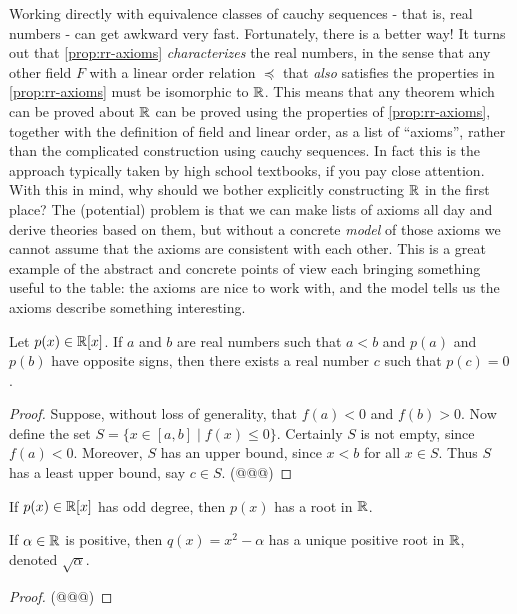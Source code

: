 Working directly with equivalence classes of cauchy sequences - that is, real numbers - can get awkward very fast. Fortunately, there is a better way! It turns out that \ref{prop:rr-axioms} \emph{characterizes} the real numbers, in the sense that any other field \(F\) with a linear order relation \(\preceq\) that \emph{also} satisfies the properties in \ref{prop:rr-axioms} must be isomorphic to \(\mathbb{R}\). This means that any theorem which can be proved about \(\mathbb{R}\) can be proved using the properties of \ref{prop:rr-axioms}, together with the definition of field and linear order, as a list of ``axioms'', rather than the complicated construction using cauchy sequences. In fact this is the approach typically taken by high school textbooks, if you pay close attention. With this in mind, why should we bother explicitly constructing \(\mathbb{R}\) in the first place? The (potential) problem is that we can make lists of axioms all day and derive theories based on them, but without a concrete \emph{model} of those axioms we cannot assume that the axioms are consistent with each other. This is a great example of the abstract and concrete points of view each bringing something useful to the table: the axioms are nice to work with, and the model tells us the axioms describe something interesting.

\begin{prop}
Let \(p(x) \in \mathbb{R}[x]\). If \(a\) and \(b\) are real numbers such that \(a < b\) and \(p(a)\) and \(p(b)\) have opposite signs, then there exists a real number \(c\) such that \(p(c) = 0\).
\end{prop}

\begin{proof}
Suppose, without loss of generality, that \(f(a) < 0\) and \(f(b) > 0\). Now define the set \(S = \{ x \in [a,b] \mid f(x) \leq 0 \}\). Certainly \(S\) is not empty, since \(f(a) < 0\). Moreover, \(S\) has an upper bound, since \(x < b\) for all \(x \in S\). Thus \(S\) has a least upper bound, say \(c \in S\). (@@@)
\end{proof}

\begin{cor} \mbox{}
\begin{proplist}
\item If \(p(x) \in \mathbb{R}[x]\) has odd degree, then \(p(x)\) has a root in \(\mathbb{R}\).
\item If \(\alpha \in \mathbb{R}\) is positive, then \(q(x) = x^2 - \alpha\) has a unique positive root in \(\mathbb{R}\), denoted \(\sqrt{\alpha}\).
\end{proplist}
\end{cor}

\begin{proof}
(@@@)
\end{proof}
